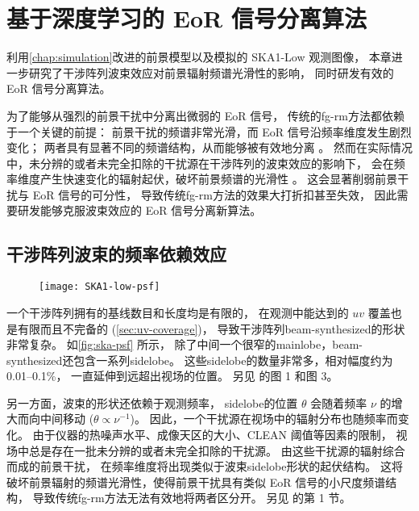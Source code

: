 
\chapter{基于深度学习的 EoR 信号分离算法}
\label{chap:cdae}

利用\autoref{chap:simulation}改进的前景模型以及模拟的 SKA1-Low 观测图像，
本章进一步研究了干涉阵列波束效应对前景辐射频谱光滑性的影响，
同时研发有效的 EoR 信号分离算法。

为了能够从强烈的前景干扰中分离出微弱的 EoR 信号，
传统的\ac{fg-rm}方法都依赖于一个关键的前提：
前景干扰的频谱非常光滑，而 EoR 信号沿频率维度发生剧烈变化；
两者具有显著不同的频谱结构，从而能够被有效地分离 \cite{morales2010,chapman2016}。
然而在实际情况中，未分辨的或者未完全扣除的干扰源在干涉阵列的波束效应的影响下，
会在频率维度产生快速变化的辐射起伏，破坏前景频谱的光滑性 \cite{liu2009ps}。
这会显著削弱前景干扰与 EoR 信号的可分性，
导致传统\ac{fg-rm}方法的效果大打折扣甚至失效，
因此需要研发能够克服波束效应的 EoR 信号分离新算法。


\section{干涉阵列波束的频率依赖效应}
\label{sec:beam-effect}

\begin{figure}[htp]
  \centering
  \texttt{[image: SKA1-low-psf]}
  \label{fig:ska-psf}
\end{figure}

一个干涉阵列拥有的基线数目和长度均是有限的，
在观测中能达到的 $uv$ 覆盖也是有限而且不完备的 (\autoref{sec:uv-coverage})，
导致干涉阵列\ac{beam-synthesized}的形状非常复杂。
如\autoref{fig:ska-psf} 所示，
除了中间一个很窄的\ac{mainlobe}，\ac{beam-synthesized}还包含一系列\ac{sidelobe}。
这些\ac{sidelobe}的数量非常多，相对幅度约为 \numrange{0.01}{0.1}\%，
一直延伸到远超出视场的位置。
另见  的图 1 和图 3。

另一方面，波束的形状还依赖于观测频率，
\ac{sidelobe}的位置 $\theta$ 会随着频率 $\nu$ 的增大而向中间移动
($\theta \propto \nu^{-1}$)。
因此，一个干扰源在视场中的辐射分布也随频率而变化。
由于仪器的热噪声水平、成像天区的大小、CLEAN 阈值等因素的限制，
视场中总是存在一批未分辨的或者未完全扣除的干扰源。
由这些干扰源的辐射综合而成的前景干扰，
在频率维度将出现类似于波束\ac{sidelobe}形状的起伏结构。
这将破坏前景辐射的频谱光滑性，使得前景干扰具有类似 EoR 信号的小尺度频谱结构，
导致传统\ac{fg-rm}方法无法有效地将两者区分开。
另见  的第 1 节。



